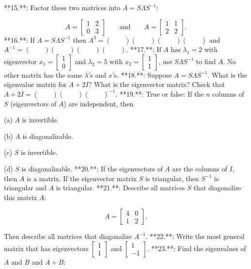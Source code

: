 

**15.**: Factor these two matrices into \(A=S\Lambda S^{-1}\):

\[A=\begin{bmatrix}1&2\\ 0&3\end{bmatrix}\qquad\text{and}\qquad A=\begin{bmatrix}1&1\\ 2&2\end{bmatrix}.\]
**16.**: If \(A=S\Lambda S^{-1}\) then \(A^{3}=(\qquad)(\qquad)(\qquad)(\qquad)\) and \(A^{-1}=(\qquad)(\qquad)(\qquad)(\qquad)\).
**17.**: If \(A\) has \(\lambda_{1}=2\) with eigenvector \(x_{1}=\begin{bmatrix}1\\ 0\end{bmatrix}\) and \(\lambda_{2}=5\) with \(x_{2}=\begin{bmatrix}1\\ 1\end{bmatrix}\), use \(S\Lambda S^{-1}\) to find \(A\). No other matrix has the same \(\lambda\)'s and \(x\)'s.
**18.**: Suppose \(A=S\Lambda S^{-1}\). What is the eigenvalue matrix for \(A+2I\)? What is the eigenvector matrix? Check that \(A+2I=(\qquad)(\qquad)(\qquad)^{-1}\).
**19.**: True or false: If the \(n\) columns of \(S\) (eigenvectors of \(A\)) are independent, then

(a) \(A\) is invertible.

(b) \(A\) is diagonalizable.

(c) \(S\) is invertible.

(d) \(S\) is diagonalizable.
**20.**: If the eigenvectors of \(A\) are the columns of \(I\), then \(A\) is a matrix. If the eigenvector matrix \(S\) is triangular, then \(S^{-1}\) is triangular and \(A\) is triangular.
**21.**: Describe all matrices \(S\) that diagonalize this matrix \(A\):

\[A=\begin{bmatrix}4&0\\ 1&2\end{bmatrix}.\]

Then describe all matrices that diagonalize \(A^{-1}\).
**22.**: Write the most general matrix that has eigenvectors \(\begin{bmatrix}1\\ 1\end{bmatrix}\) and \(\begin{bmatrix}1\\ -1\end{bmatrix}\).
**23.**: Find the eigenvalues of \(A\) and \(B\) and \(A+B\):

